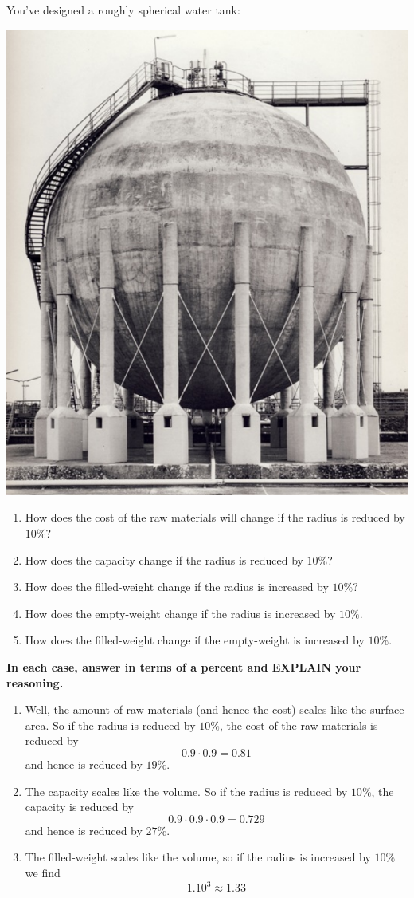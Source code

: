 \documentclass[nooutcomes,noauthor,handout]{ximera}
\begin{document}
\begin{question} 
  You've designed a roughly spherical water tank:
\begin{center}%
  \includegraphics[width=.4\textwidth]{tank.png}  
\end{center}
\begin{enumerate}
\item How does the cost of the raw materials will change if the radius
  is reduced by $10\%$?
\item How does the capacity change if the radius is reduced by $10\%$?
\item How does the filled-weight change if the radius is increased by
  $10\%$?
\item How does the empty-weight change if the radius is increased by
  $10\%$.
\item How does the filled-weight change if the empty-weight is
  increased by $10\%$.
\end{enumerate}
\textbf{In each case, answer in terms of a percent and EXPLAIN your reasoning.}
\begin{freeResponse}
  \begin{enumerate}
  \item Well, the amount of raw materials (and hence the cost) scales
    like the surface area. So if the radius is reduced by $10\%$, the
    cost of the raw materials is reduced by
    \[
    0.9\cdot 0.9 = 0.81
    \]
    and hence is reduced by $19\%$.
  \item The capacity scales like the volume.  So if the radius is
    reduced by $10\%$, the capacity is reduced by
    \[
    0.9\cdot 0.9\cdot 0.9 = 0.729
    \]
    and hence is reduced by $27\%$.
  \item The filled-weight scales like the volume, so if the radius is
    increased by $10\%$ we find
    \[
    1.10^3 \approx 1.33
\]
\end{enumerate}
\end{freeResponse}
\end{question}
\end{document}
